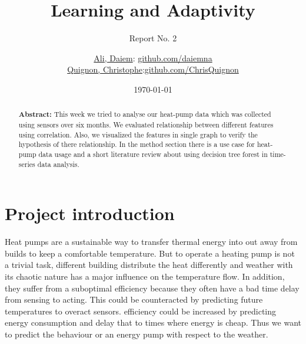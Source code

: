 \documentclass{scrartcl}
\begin{document}
\title{Learning and Adaptivity}
\subtitle{Report No. 2}
\author{
  \href{daiem.ali@smail.inf.h-brs.de}{Ali, Daiem}: \href{https://github.com/daiemna}{github.com/daiemna}\\
  \href{christophe.quignon@smail.inf.h-brs.de}{Quignon, Christophe}:\href{https://github.com/ChrisQuignon}{github.com/ChrisQuignon}
}
\date{\today}


\maketitle



\begin{abstract}
\textbf{Abstract:} This week we tried to analyse our heat-pump data which was collected using sensors over six months. We evaluated relationship between different features using correlation. Also, we visualized the features in single graph to verify the hypothesis of there relationship. In the method section there is a use case for heat-pump data usage and a short literature review about using decision tree forest in time-series data analysis.
\end{abstract}


\section{Project introduction}

Heat pumps are a sustainable way to transfer thermal energy into out away from builds to keep a comfortable temperature. But to operate a heating pump is not a trivial task, different building distribute the heat differently and weather with its chaotic nature has a major influence on the temperature flow. In addition, they suffer from a suboptimal efficiency because they often have a bad time delay from sensing to acting. This could be counteracted by predicting future temperatures to overact sensors. efficiency could be increased by predicting energy consumption and delay that to times where energy is cheap. 
Thus we want to predict the behaviour or an energy pump with respect to the weather.
\end{document}
